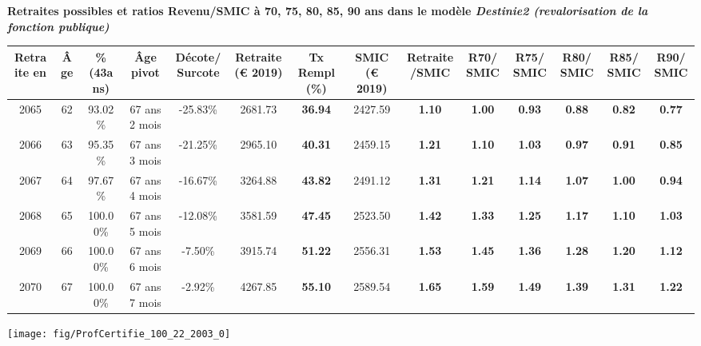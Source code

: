  \vspace{0.1cm} 
{\bf \noindent Retraites possibles et ratios Revenu/SMIC à 70, 75, 80, 85, 90 ans dans le modèle \emph{Destinie2 (revalorisation de la fonction publique)}}  
 
\begin{adjustbox}{max width=\textwidth} 
\begin{tabular}[htb]{|c|c||c|c|c||c|c||c|c||c|c|c|c|c|} 
\hline 
 Retraite en &  Âge &  \%(43ans) &  Âge pivot &  Décote/Surcote &  Retraite (\euro{} 2019) &  Tx Rempl(\%) &  SMIC (\euro{} 2019) &  Retraite/SMIC &  R70/SMIC &  R75/SMIC &  R80/SMIC &  R85/SMIC &  R90/SMIC \\ 
\hline \hline 
 2065 &  62 &  93.02\% &  67 ans 2 mois &  -25.83\% &  2681.73 &  {\bf 36.94} &  2427.59 &  {\bf 1.10} &  {\bf {\color{red} 1.00}} &  {\bf {\color{red} 0.93}} &  {\bf {\color{red} 0.88}} &  {\bf {\color{red} 0.82}} &  {\bf {\color{red} 0.77}} \\ 
\hline 
 2066 &  63 &  95.35\% &  67 ans 3 mois &  -21.25\% &  2965.10 &  {\bf 40.31} &  2459.15 &  {\bf 1.21} &  {\bf 1.10} &  {\bf 1.03} &  {\bf {\color{red} 0.97}} &  {\bf {\color{red} 0.91}} &  {\bf {\color{red} 0.85}} \\ 
\hline 
 2067 &  64 &  97.67\% &  67 ans 4 mois &  -16.67\% &  3264.88 &  {\bf 43.82} &  2491.12 &  {\bf 1.31} &  {\bf 1.21} &  {\bf 1.14} &  {\bf 1.07} &  {\bf {\color{red} 1.00}} &  {\bf {\color{red} 0.94}} \\ 
\hline 
 2068 &  65 &  100.00\% &  67 ans 5 mois &  -12.08\% &  3581.59 &  {\bf 47.45} &  2523.50 &  {\bf 1.42} &  {\bf 1.33} &  {\bf 1.25} &  {\bf 1.17} &  {\bf 1.10} &  {\bf 1.03} \\ 
\hline 
 2069 &  66 &  100.00\% &  67 ans 6 mois &  -7.50\% &  3915.74 &  {\bf 51.22} &  2556.31 &  {\bf 1.53} &  {\bf 1.45} &  {\bf 1.36} &  {\bf 1.28} &  {\bf 1.20} &  {\bf 1.12} \\ 
\hline 
 2070 &  67 &  100.00\% &  67 ans 7 mois &  -2.92\% &  4267.85 &  {\bf 55.10} &  2589.54 &  {\bf 1.65} &  {\bf 1.59} &  {\bf 1.49} &  {\bf 1.39} &  {\bf 1.31} &  {\bf 1.22} \\ 
\hline 
\hline 
\end{tabular} 
\end{adjustbox} 
 
 \vspace{0.1cm} 

 {\hspace{-2.2cm}\texttt{[image: fig/ProfCertifie\_100\_22\_2003\_0]}} 

